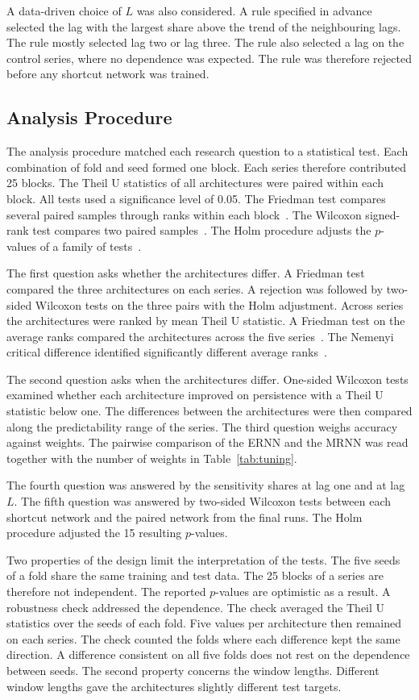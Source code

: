 \documentclass[conference,10pt]{IEEEtran}
\begin{document}
A data-driven choice of $L$ was also considered.
A rule specified in advance selected the lag with the largest share
above the trend of the neighbouring lags.
The rule mostly selected lag two or lag three.
The rule also selected a lag on the control series, where no dependence
was expected.
The rule was therefore rejected before any shortcut network was trained.

\subsection{Analysis Procedure}

The analysis procedure matched each research question to a statistical
test.
Each combination of fold and seed formed one block.
Each series therefore contributed 25 blocks.
The Theil U statistics of all architectures were paired within each
block.
All tests used a significance level of 0.05.
The Friedman test compares several paired samples through ranks within
each block~\cite{friedman1937}.
The Wilcoxon signed-rank test compares two paired
samples~\cite{wilcoxon1945}.
The Holm procedure adjusts the $p$-values of a family of
tests~\cite{holm1979}.

The first question asks whether the architectures differ.
A Friedman test compared the three architectures on each series.
A rejection was followed by two-sided Wilcoxon tests on the three pairs
with the Holm adjustment.
Across series the architectures were ranked by mean Theil U statistic.
A Friedman test on the average ranks compared the architectures across
the five series~\cite{demsar2006}.
The Nemenyi critical difference identified significantly different
average ranks~\cite{demsar2006}.

The second question asks when the architectures differ.
One-sided Wilcoxon tests examined whether each architecture improved on
persistence with a Theil U statistic below one.
The differences between the architectures were then compared along the
predictability range of the series.
The third question weighs accuracy against weights.
The pairwise comparison of the ERNN and the MRNN was read together with
the number of weights in Table~\ref{tab:tuning}.

The fourth question was answered by the sensitivity shares at lag one
and at lag $L$.
The fifth question was answered by two-sided Wilcoxon tests between each
shortcut network and the paired network from the final runs.
The Holm procedure adjusted the 15 resulting $p$-values.

Two properties of the design limit the interpretation of the tests.
The five seeds of a fold share the same training and test data.
The 25 blocks of a series are therefore not independent.
The reported $p$-values are optimistic as a result.
A robustness check addressed the dependence.
The check averaged the Theil U statistics over the seeds of each fold.
Five values per architecture then remained on each series.
The check counted the folds where each difference kept the same
direction.
A difference consistent on all five folds does not rest on the
dependence between seeds.
The second property concerns the window lengths.
Different window lengths gave the architectures slightly different test
targets.
\end{document}
